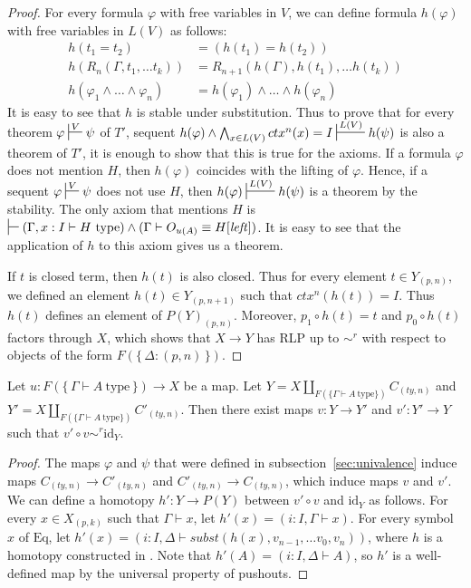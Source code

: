 \documentclass{mscs}
\newcommand{\deq}{\equiv}
\newcommand{\Eq}{\mathrm{Eq}}
\newcommand{\id}{\mathrm{id}}
\newcommand{\subst}{\mathit{subst}}
\newcommand{\leftI}{\mathit{left}}
\newcommand{\type}{\mathrm{type}}
\numberwithin{figure}{section}
\begin{document}
\begin{proof}
For every formula $\varphi$ with free variables in $V$, we can define formula $h(\varphi)$ with free variables in $L(V)$ as follows:
\begin{align*}
h(t_1 = t_2) & = (h(t_1) = h(t_2)) \\
h(R_n(\Gamma, t_1, \ldots t_k)) & = R_{n+1}(h(\Gamma), h(t_1), \ldots h(t_k)) \\
h(\varphi_1 \land \ldots \land \varphi_n) & = h(\varphi_1) \land \ldots \land h(\varphi_n)
\end{align*}
It is easy to see that $h$ is stable under substitution.
Thus to prove that for every theorem $\varphi \sststile{}{V} \psi$ of $T'$, sequent $h(\varphi) \land \bigwedge_{x \in L(V)} ctx^n(x) = I \sststile{}{L(V)} h(\psi)$
is also a theorem of $T'$, it is enough to show that this is true for the axioms.
If a formula $\varphi$ does not mention $H$, then $h(\varphi)$ coincides with the lifting of $\varphi$.
Hence, if a sequent $\varphi \sststile{}{V} \psi$ does not use $H$, then $h(\varphi) \sststile{}{L(V)} h(\psi)$ is a theorem by the stability.
The only axiom that mentions $H$ is $\sststile{}{} (\Gamma, x : I \vdash H\ \type) \land (\Gamma \vdash O_{u(A)} \deq H[\leftI])$.
It is easy to see that the application of $h$ to this axiom gives us a theorem.

If $t$ is closed term, then $h(t)$ is also closed.
Thus for every element $t \in Y_{(p,n)}$, we defined an element $h(t) \in Y_{(p,n+1)}$ such that $ctx^n(h(t)) = I$.
Thus $h(t)$ defines an element of $P(Y)_{(p,n)}$.
Moreover, $p_1 \circ h(t) = t$ and $p_0 \circ h(t)$ factors through $X$,
which shows that $X \to Y$ has RLP up to $\sim^r$ with respect to objects of the form $F(\{\,\Delta : (p,n)\,\})$.
\end{proof}

\begin{lem}[Jhom]
Let $u : F(\{\,\Gamma \vdash A\ \type\,\}) \to X$ be a map.
Let $Y = X \amalg_{F(\{ \Gamma \vdash A\ \type \})} C_{(ty,n)}$ and $Y' = X \amalg_{F(\{ \Gamma \vdash A\ \type \})} C'_{(ty,n)}$.
Then there exist maps $v : Y \to Y'$ and $v' : Y' \to Y$ such that $v' \circ v \sim^r \id_Y$.
\end{lem}
\begin{proof}
The maps $\varphi$ and $\psi$ that were defined in subsection~\ref{sec:univalence} induce maps $C_{(ty,n)} \to C'_{(ty,n)}$ and $C'_{(ty,n)} \to C_{(ty,n)}$, which induce maps $v$ and $v'$.
We can define a homotopy $h' : Y \to P(Y)$ between $v' \circ v$ and $\id_Y$ as follows.
For every $x \in X_{(p,k)}$ such that $\Gamma \vdash x$, let $h'(x) = (i : I, \Gamma \vdash x)$.
For every symbol $x$ of $\Eq$, let $h'(x) = (i : I, \Delta \vdash \subst(h(x), v_{n-1}, \ldots v_0, v_n))$, where $h$ is a homotopy constructed in .
Note that $h'(A) = (i : I, \Delta \vdash A)$, so $h'$ is a well-defined map by the universal property of pushouts.
\end{proof}
\end{document}
